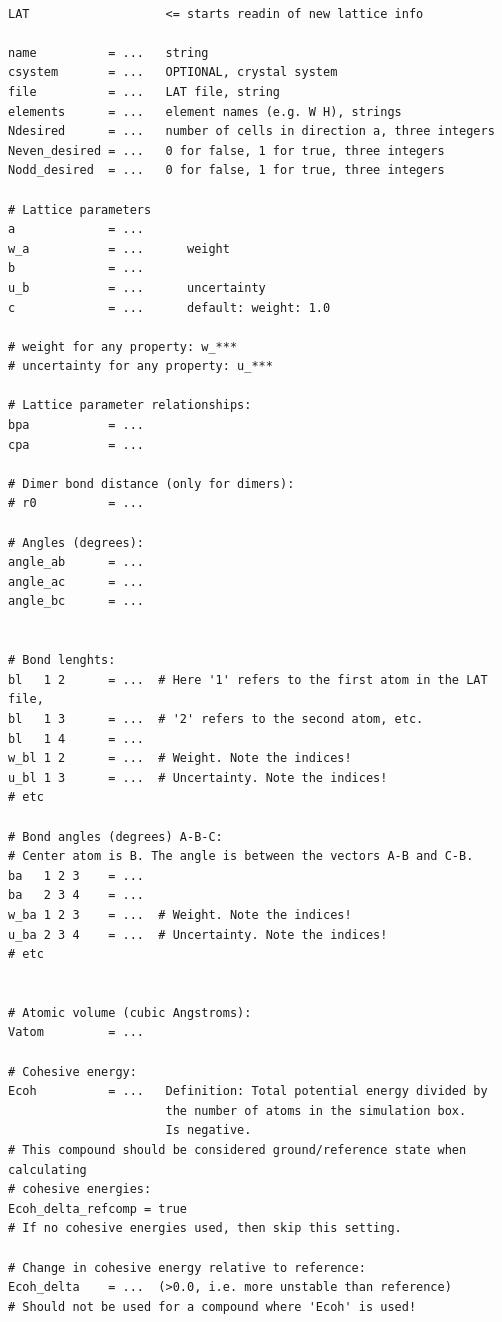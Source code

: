 \documentclass[a4paper,12pt,pdftex,onecolumn]{article}
\begin{document}
\begin{Verbatim}[fontsize=\relsize{-1},frame=single]

LAT                   <= starts readin of new lattice info

name          = ...   string
csystem       = ...   OPTIONAL, crystal system
file          = ...   LAT file, string
elements      = ...   element names (e.g. W H), strings
Ndesired      = ...   number of cells in direction a, three integers
Neven_desired = ...   0 for false, 1 for true, three integers
Nodd_desired  = ...   0 for false, 1 for true, three integers

# Lattice parameters
a             = ...
w_a           = ...      weight
b             = ...      
u_b           = ...      uncertainty
c             = ...      default: weight: 1.0

# weight for any property: w_***
# uncertainty for any property: u_***

# Lattice parameter relationships:
bpa           = ...
cpa           = ...

# Dimer bond distance (only for dimers):
# r0          = ...

# Angles (degrees):
angle_ab      = ...
angle_ac      = ...
angle_bc      = ...


# Bond lenghts:
bl   1 2      = ...  # Here '1' refers to the first atom in the LAT file,
bl   1 3      = ...  # '2' refers to the second atom, etc.
bl   1 4      = ...
w_bl 1 2      = ...  # Weight. Note the indices!
u_bl 1 3      = ...  # Uncertainty. Note the indices!
# etc

# Bond angles (degrees) A-B-C:
# Center atom is B. The angle is between the vectors A-B and C-B.
ba   1 2 3    = ...
ba   2 3 4    = ...
w_ba 1 2 3    = ...  # Weight. Note the indices!
u_ba 2 3 4    = ...  # Uncertainty. Note the indices!
# etc


# Atomic volume (cubic Angstroms):
Vatom         = ...

# Cohesive energy:
Ecoh          = ...   Definition: Total potential energy divided by
                      the number of atoms in the simulation box.
                      Is negative.
# This compound should be considered ground/reference state when calculating
# cohesive energies:
Ecoh_delta_refcomp = true
# If no cohesive energies used, then skip this setting.

# Change in cohesive energy relative to reference:
Ecoh_delta    = ...  (>0.0, i.e. more unstable than reference)
# Should not be used for a compound where 'Ecoh' is used!


\end{Verbatim}
\end{document}
